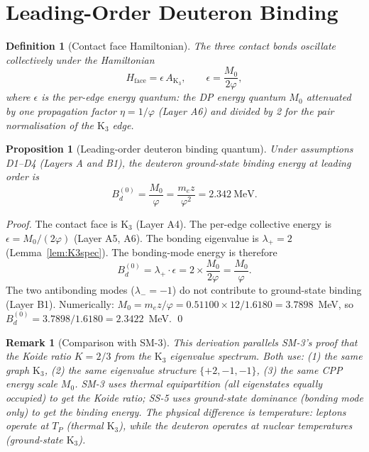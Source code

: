 \documentclass[11pt,letterpaper]{article}
\newtheorem{proposition}[theorem]{Proposition}
\newtheorem{definition}[theorem]{Definition}
\newtheorem{remark}[theorem]{Remark}
\newcommand{\phig}{\varphi}
\newcommand{\Kthree}{\mathrm{K}_3}
\newcommand{\Mzero}{M_0}
\newcommand{\Bdlo}{B_d^{(0)}}
\begin{document}
\section{Leading-Order Deuteron Binding}
\label{sec:LO}

\begin{definition}[Contact face Hamiltonian]
The three contact bonds oscillate collectively under the
Hamiltonian
\begin{equation}
H_{\mathrm{face}} = \epsilon\, A_{\Kthree},
\qquad
\epsilon = \frac{\Mzero}{2\phig},
\label{eq:Hface}
\end{equation}
where $\epsilon$ is the per-edge energy quantum: the DP
energy quantum $\Mzero$ attenuated by one propagation factor
$\eta = 1/\phig$ (Layer A6) and divided by 2 for the
pair normalisation of the $\Kthree$ edge.
\end{definition}

\begin{proposition}[Leading-order deuteron binding quantum]
\label{prop:LO}
Under assumptions D1--D4 (Layers A and B1), the deuteron
ground-state binding energy at leading order is
\begin{equation}
\boxed{
\Bdlo = \frac{\Mzero}{\phig}
= \frac{m_e z}{\phig^2}
= 2.342~\text{MeV}.
}
\label{eq:BdLO}
\end{equation}
\end{proposition}

\begin{proof}
The contact face is $\Kthree$ (Layer A4).  The per-edge
collective energy is $\epsilon = \Mzero/(2\phig)$ (Layer A5,
A6).  The bonding eigenvalue is $\lambda_+ = 2$
(Lemma~\ref{lem:K3spec}).  The bonding-mode energy is
therefore
\[
\Bdlo = \lambda_+ \cdot \epsilon
= 2 \times \frac{\Mzero}{2\phig}
= \frac{\Mzero}{\phig}.
\]
The two antibonding modes ($\lambda_- = -1$) do not contribute
to ground-state binding (Layer B1).
Numerically:
$\Mzero = m_e z/\phig = 0.51100 \times 12 / 1.6180 = 3.7898$~MeV,
so $\Bdlo = 3.7898/1.6180 = 2.3422$~MeV. \qed
\end{proof}

\begin{remark}[Comparison with SM-3]
This derivation parallels SM-3's proof that the Koide ratio
$K = 2/3$ from the $\Kthree$ eigenvalue spectrum.
Both use: (1) the same graph $\Kthree$, (2) the same
eigenvalue structure $\{+2, -1, -1\}$, (3) the same CPP
energy scale $\Mzero$.  SM-3 uses thermal equipartition
(all eigenstates equally occupied) to get the Koide ratio;
SS-5 uses ground-state dominance (bonding mode only) to get
the binding energy.  The physical difference is temperature:
leptons operate at $T_P$ (thermal $\Kthree$), while the
deuteron operates at nuclear temperatures (ground-state
$\Kthree$).
\end{remark}
\end{document}
